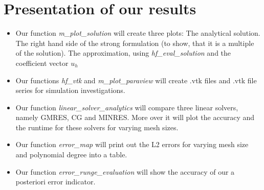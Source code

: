 \section{Presentation of our results}
\begin{itemize}
\item Our function \textit{m\_plot\_solution} will create three plots: The analytical solution. The right hand side of the strong formulation (to show, that it is a multiple of the solution). The approximation, using \textit{hf\_eval\_solution} and the coefficient vector $u_h$
\item Our functions \textit{hf\_vtk} and \textit{m\_plot\_paraview} will create .vtk files and .vtk file series for simulation investigations.
\item Our function \textit{linear\_solver\_analytics} will compare three linear solvers, namely GMRES, CG and MINRES. More over it will plot the accuracy and the runtime for
these solvers for varying mesh sizes.
\item Our function \textit{error\_map} will print out the L2 errors for varying mesh size and polynomial degree into a table.
\item Our function \textit{error\_runge\_evaluation} will show the accuracy of our a posteriori error indicator.
\end{itemize}

